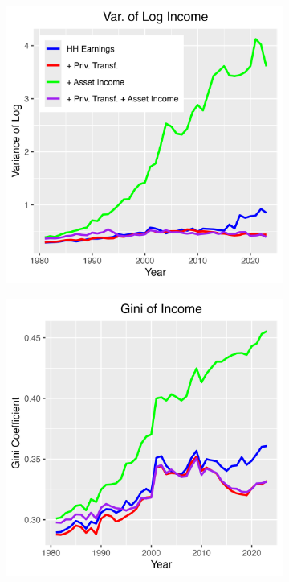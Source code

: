 \documentclass{article}
\begin{document}
\begin{figure}
    \centering
    \begin{subfigure}[t]{0.475\textwidth}
        \centering
        \includegraphics[width=\textwidth]{figures/Fig_4/Fig_4a_Var_inc.png}
    \end{subfigure}
    \begin{subfigure}[t]{0.475\textwidth}
        \centering
        \includegraphics[width=\textwidth]{figures/Fig_4/Fig_4b_Gini_inc.png}

\end{subfigure}
\end{figure}
\end{document}

